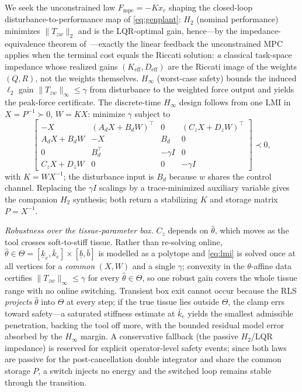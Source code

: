 We seek the unconstrained law $F_{\text{mpc}}=-K x_e$ shaping the closed-loop disturbance-to-performance map of \eqref{eq:genplant}: \emph{$H_2$} (nominal performance) minimizes $\|T_{zw}\|_2$ and is the LQR-optimal gain, hence---by the impedance-equivalence theorem of~\cite{cao2026phri}---exactly the linear feedback the unconstrained MPC applies when the terminal cost equals the Riccati solution: \emph{a} classical task-space impedance whose realized gains $(K_{\text{eff}},D_{\text{eff}})$ are the Riccati image of the weights $(Q,R)$, not the weights themselves. \emph{$H_\infty$} (worst-case safety) bounds the induced $\ell_2$ gain $\|T_{zw}\|_\infty\le\gamma$ from disturbance to the weighted force output and yields the peak-force certificate. The discrete-time $H_\infty$ design follows from one LMI in $X=P^{-1}\succ0$, $W=KX$: minimize $\gamma$ subject to
\begin{equation}
\begin{bmatrix} -X & (A_dX{+}B_dW)^\top & 0 & (C_zX{+}D_zW)^\top\\ A_dX{+}B_dW & -X & B_d & 0\\ 0 & B_d^\top & -\gamma I & 0\\ C_zX{+}D_zW & 0 & 0 & -\gamma I \end{bmatrix}\!\prec 0,
\label{eq:lmi}
\end{equation}
with $K=WX^{-1}$; the disturbance input is $B_d$ because $w$ shares the control channel. Replacing the $\gamma I$ scalings by a trace-minimized auxiliary variable gives the companion $H_2$ synthesis; both return a stabilizing $K$ and storage matrix $P=X^{-1}$.

\emph{Robustness over the tissue-parameter box.} $C_z$ depends on $\hat\theta$, which moves as the tool crosses soft-to-stiff tissue. Rather than re-solving online, $\hat\theta\in\Theta=[\underline{k}_e,\bar{k}_e]\times[\underline{b},\bar{b}]$ is modelled as a polytope and \eqref{eq:lmi} is solved once at all vertices for a \emph{common} $(X,W)$ and a single $\gamma$; convexity in the $\theta$-affine data certifies $\|T_{zw}\|_\infty\le\gamma$ for every $\hat\theta\in\Theta$, so one robust gain covers the whole tissue range with no online switching. Transient box exit cannot occur because the RLS \emph{projects} $\hat\theta$ into $\Theta$ at every step; if the true tissue lies outside $\Theta$, the clamp errs toward safety---a saturated stiffness estimate at $\bar k_e$ yields the smallest admissible penetration, backing the tool off more, with the bounded residual model error absorbed by the $H_\infty$ margin. A conservative fallback (the passive $H_2$/LQR impedance) is reserved for explicit operator-level safety events; since both laws are passive for the post-cancellation double integrator and share the common storage $P$, a switch injects no energy and the switched loop remains stable through the transition.

